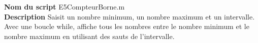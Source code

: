 \textbf{Nom du script}
E5CompteurBorne.m\\
\textbf{Description}
Saisit un nombre minimum, un nombre maximum et un intervalle. Avec une boucle while, affiche tous les nombres entre le nombre minimum et le nombre maximum en utilisant des sauts de l'intervalle.